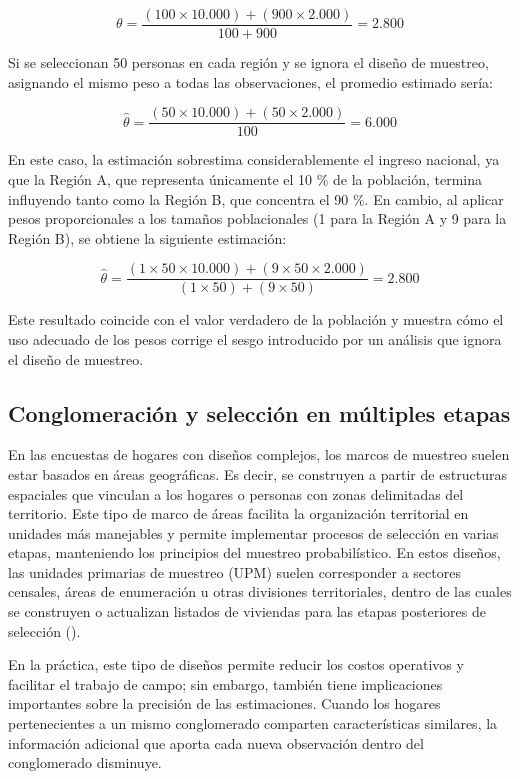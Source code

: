 \documentclass[
  spanish,
  11pt,
  letterpaper,
  oneside,
  open=any]{scrbook}
\begin{document}
\[\theta =
\frac{(100 \times 10.000) + (900 \times 2.000)}
{100 + 900}
= 2.800\]

Si se seleccionan 50 personas en cada región y se ignora el diseño de
muestreo, asignando el mismo peso a todas las observaciones, el promedio
estimado sería:

\[\hat{\theta} =
\frac{(50 \times 10.000) + (50 \times 2.000)}
{100}
= 6.000\]

En este caso, la estimación sobrestima considerablemente el ingreso
nacional, ya que la Región A, que representa únicamente el 10 \% de la
población, termina influyendo tanto como la Región B, que concentra el
90 \%. En cambio, al aplicar pesos proporcionales a los tamaños
poblacionales (1 para la Región A y 9 para la Región B), se obtiene la
siguiente estimación:

\[\hat{\theta} =
\frac{(1 \times 50 \times 10.000) + (9 \times 50 \times 2.000)}
{(1 \times 50) + (9 \times 50)}
= 2.800\]

Este resultado coincide con el valor verdadero de la población y muestra
cómo el uso adecuado de los pesos corrige el sesgo introducido por un
análisis que ignora el diseño de muestreo.

\subsection{Conglomeración y selección en múltiples
etapas}\label{conglomeraciuxf3n-y-selecciuxf3n-en-muxfaltiples-etapas}

En las encuestas de hogares con diseños complejos, los marcos de
muestreo suelen estar basados en áreas geográficas. Es decir, se
construyen a partir de estructuras espaciales que vinculan a los hogares
o personas con zonas delimitadas del territorio. Este tipo de marco de
áreas facilita la organización territorial en unidades más manejables y
permite implementar procesos de selección en varias etapas, manteniendo
los principios del muestreo probabilístico. En estos diseños, las
unidades primarias de muestreo (UPM) suelen corresponder a sectores
censales, áreas de enumeración u otras divisiones territoriales, dentro
de las cuales se construyen o actualizan listados de viviendas para las
etapas posteriores de selección
().

En la práctica, este tipo de diseños permite reducir los costos
operativos y facilitar el trabajo de campo; sin embargo, también tiene
implicaciones importantes sobre la precisión de las estimaciones. Cuando
los hogares pertenecientes a un mismo conglomerado comparten
características similares, la información adicional que aporta cada
nueva observación dentro del conglomerado disminuye.
\end{document}
